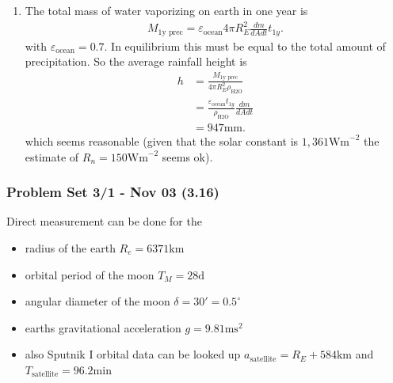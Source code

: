 \documentclass[10pt,a4paper]{article}
\theoremstyle{definition}
\begin{document}
\begin{enumerate}[label=(\alph*)]
\item The total mass of water vaporizing on earth in one year is
\begin{align}
    M_\text{1y prec}=\varepsilon_\text{ocean} 4\pi R_E^2  \frac{dm}{dA dt} t_{1y}.
\end{align}
with $\varepsilon_\text{ocean}=0.7$. In equilibrium this must be equal to the total amount of precipitation. So the average rainfall height is 
\begin{align}
    h&=\frac{M_\text{1y prec}}{4\pi R_E^2\rho_\text{H2O}}\\
    &=\frac{\varepsilon_\text{ocean}t_{1y}}{\rho_\text{H2O}} \frac{dm}{dA dt}\\
    &=947\text{mm}.
\end{align}
which seems reasonable (given that the solar constant is $1,361\text{Wm}^{-2}$ the estimate of $R_n=150\text{Wm}^{-2}$ seems ok).
\end{enumerate}

\subsubsection{Problem Set 3/1 - Nov 03 (3.16)}
Direct measurement can be done for the
\begin{itemize}
    \item radius of the earth $R_e=6371\text{km}$
    \item orbital period of the moon $T_M=28\text{d}$
    \item angular diameter of the moon $\delta=30'=0.5^\circ$
    \item earths gravitational acceleration $g=9.81\text{ms}^2$
    \item also Sputnik I orbital data can be looked up $a_\text{satellite}=R_E+584\text{km}$ and $T_\text{satellite}=96.2\text{min}$
\end{itemize}
\end{document}
